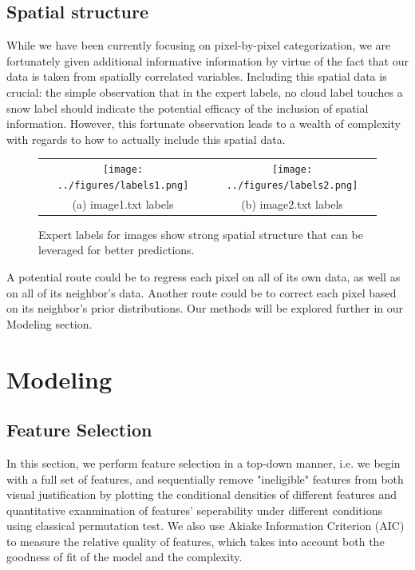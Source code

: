\documentclass[english]{article}\usepackage{graphicx, color}
\numberwithin{equation}{section}
\numberwithin{figure}{section}
\begin{document}
\subsection{Spatial structure}
While we have been currently focusing on pixel-by-pixel categorization, we are
fortunately given additional informative information by virtue of the fact that our
data is taken from spatially correlated variables. Including this spatial data is
crucial: the simple observation that in the expert labels, no cloud label touches
a snow label should indicate the potential efficacy of the inclusion of spatial
information. However, this fortunate observation leads to a wealth of complexity
with regards to how to actually include this spatial data.


\begin{figure}[!h]
\begin{tabular}{cc}
  \texttt{[image: ../figures/labels1.png]} &
  \texttt{[image: ../figures/labels2.png]}  \\
  (a) image1.txt labels & (b) image2.txt labels
\end{tabular}
\caption{Expert labels for images show strong spatial structure that can be 
	leveraged for better predictions.}
\end{figure}


A potential route could be to regress each pixel on all of its own data, as well as
on all of its neighbor's data. Another route could be to correct each pixel based
on its neighbor's prior distributions. Our methods will be explored further in our
Modeling section.


\section{Modeling}

\subsection{Feature Selection}
In this section, we perform feature selection in a top-down manner, i.e. we begin with a full set of features, and sequentially remove "ineligible" features from both visual justification by plotting the conditional densities of different features and quantitative exanmination of features' seperability under different conditions using classical permutation test. We also use Akiake Information Criterion (AIC) to measure the relative quality of features, which takes into account both the goodness of fit of the model and the complexity.\\
\end{document}
